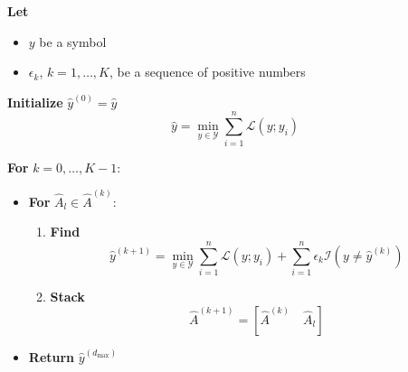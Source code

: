 \textbf{Let}
\begin{itemize}
	\item \(y\) be a symbol
	\item \(\epsilon_k\), \(k=1,\dots,K\), be a sequence of positive numbers
\end{itemize}

\textbf{Initialize} \(\hat{y}^{(0)} = \hat{y}\)
%
\[
	\hat{y} =
	\min_{y \in \mathcal{Y}} \sum_{i=1}^n \mathcal{L}(y;y_i)
\]
%

\textbf{For} \(k = 0,\dots,K-1\):
\begin{itemize}
	\item[] \textbf{For} \(\hat{A}_l \in \hat{A}^{(k)}\):
	\begin{enumerate}
		\item \textbf{Find}
		\[
			\hat{y}^{(k+1)} = \min_{y \in \mathcal{Y}} \sum_{i=1}^n \mathcal{L}(y;y_i)
			+ \sum_{i=1}^n \epsilon_k \mathcal{I}(y \neq \hat{y}^{(k)})
		\]
		\item \textbf{Stack}
		\[
			\hat{A}^{(k+1)} = \left[ \hat{A}^{(k)} \quad \hat{A}_l \right]
		\]
	\end{enumerate}

	\item[] \textbf{Return} \(\hat{y}^{(d_{\max})}\)
\end{itemize}
